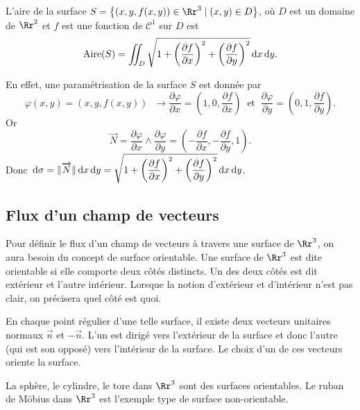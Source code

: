 \documentclass[class=report,crop=false]{standalone}
\begin{document}
\vskip6mm

L'aire de la surface $\displaystyle S=\left\{(x,y,f(x,y))\in \Rr^3\mid (x,y)\in D\right\}$, o\`u $D$ est un domaine de $\Rr^2$ et $f$ est une fonction de $\mathscr{C}^1$ sur $D$ est
$${\rm Aire} (S)=\int\!\!\!\!\int _D\sqrt{1+\left(\frac{\partial f}{\partial x}\right)^2+\left( \frac{\partial f}{\partial y}\right)^2}\,\mathrm{d} x\,\mathrm{d} y.$$

\vskip2mm

\noindent En effet, une paramétrisation de la surface $S$ est donnée par 
$$\varphi (x,y)=\left(x,y,f(x,y)\right)\;\; \rightarrow \frac{\partial \varphi}{\partial x}=\left(1,0,\frac{\partial f}{\partial x}\right)\;\; \mbox{et}\;\; \frac{\partial \varphi}{\partial y}=\left(0,1,\frac{\partial f}{\partial y}\right).$$
Or
$$\overrightarrow{N}=\frac{\partial \varphi}{\partial x}\wedge \frac{\partial \varphi}{\partial y}=\left(-\frac{\partial f}{\partial x},-\frac{\partial f}{\partial y},1\right).$$
Donc $\displaystyle \,\mathrm{d} \sigma =\|\overrightarrow{N}\|\,\mathrm{d} x\,\mathrm{d} y=\sqrt{1+\left(\frac{\partial f}{\partial x}\right)^2+\left( \frac{\partial f}{\partial y}\right)^2}\,\mathrm{d} x\,\mathrm{d} y$.

\vskip8mm

\subsection{Flux d'un champ de vecteurs}

\vskip4mm

\noindent Pour définir le flux d'un champ de vecteurs à travers une surface de $\Rr^3$, on aura besoin du concept de surface orientable. Une surface de $\Rr^3$ est dite orientable si elle comporte deux c\^otés distincts. Un des deux c\^otés est dit extérieur et l'autre intérieur. Lorsque la notion d'extérieur et d'intérieur n'est pas clair, on précisera quel c\^oté est quoi.

\vskip6mm

\noindent En chaque point régulier d'une telle surface, il existe deux vecteurs unitaires normaux $\overrightarrow{n}$ et $-\overrightarrow{n}$. L'un est dirigé vers l'extérieur de la surface et donc l'autre (qui est son opposé) vers l'intérieur de la surface. Le choix d'un de ces vecteurs oriente la surface.

\vskip6mm

La sphère, le cylindre, le tore dans $\Rr^3$ sont des surfaces orientables. Le ruban de M\"obius dans $\Rr^3$ est l'exemple type de surface non-orientable.
\end{document}
